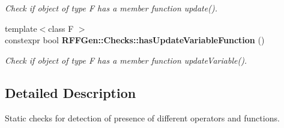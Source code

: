 \begin{DoxyCompactItemize}
\begin{DoxyCompactList}\small\item\em Check if object of type F has a member function update(). \end{DoxyCompactList}\item 
\hypertarget{namespaceRFFGen_1_1Checks_a6a8e1289d0210020d3fbebf0f0c2bb19}{{\footnotesize template$<$class F $>$ }\\constexpr bool {\bfseries R\-F\-F\-Gen\-::\-Checks\-::has\-Update\-Variable\-Function} ()}\label{namespaceRFFGen_1_1Checks_a6a8e1289d0210020d3fbebf0f0c2bb19}

\begin{DoxyCompactList}\small\item\em Check if object of type F has a member function update\-Variable(). \end{DoxyCompactList}\end{DoxyCompactItemize}


\subsection{Detailed Description}
Static checks for detection of presence of different operators and functions. 